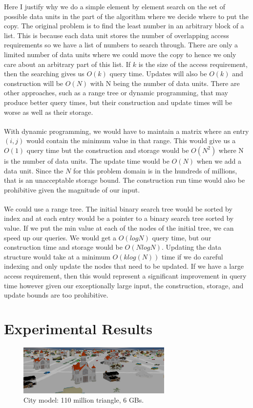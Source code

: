 \documentclass[conference]{acmsiggraph}
\begin{document}
Here I justify why we do a simple element by element search on the set of possible data units in the part of the algorithm where we decide where to put the copy. The original problem is to find the least number in an arbitrary block of a list. This is because each data unit stores the number of overlapping access requirements so we have a list of numbers to search through. There are only a limited number of data units where we could move the copy to hence we only care about an arbitrary part of this list. If $k$ is the size of the access requirement, then the searching gives us $O(k)$ query time. Updates will also be $O(k)$ and construction will be $O(N)$ with N being the number of data units. There are other approaches, such as a range tree or dynamic programming, that may produce better query times, but their construction and update times will be worse as well as their storage. \\
\\
With dynamic programming, we would have to maintain a matrix where an entry $(i,j)$ would contain the minimum value in that range. This would give us a $O(1)$ query time but the construction and storage would be $O(N^2)$ where N is the number of data units. The update time would be $O(N)$ when we add a data unit. Since the $N$ for this problem domain is in the hundreds of millions, that is an unacceptable storage bound. The construction run time would also be prohibitive given the magnitude of our input. \\
\\
We could use a range tree. The initial binary search tree would be sorted by index and at each entry would be a pointer to a binary search tree sorted by value. If we put the min value at each of the nodes of the initial tree, we can speed up our queries. We would get a $O(log N)$ query time, but our construction time and storage would be $O(N log N)$. Updating the data structure would take at a minimum $O(k log(N))$ time if we do careful indexing and only update the nodes that need to be updated. If we have a large access requirement, then this would represent a significant improvement in query time however given our exceptionally large input, the construction, storage, and update bounds are too prohibitive.  

\section{Experimental Results}

\begin{figure}[ht]
  \centering
  \includegraphics[width=3.0in]{city.png}
  \caption{City model: 110 million triangle, 6 GBs. }
  \label{fig:model1}
\end{figure}
\end{document}
